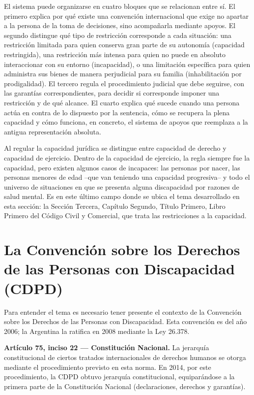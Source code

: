 \documentclass[12pt,oneside]{book}
\begin{document}
\begin{note}
El sistema puede organizarse en cuatro bloques que se relacionan entre sí. El primero explica por qué existe una convención internacional que exige no apartar a la persona de la toma de decisiones, sino acompañarla mediante apoyos. El segundo distingue qué tipo de restricción corresponde a cada situación: una restricción limitada para quien conserva gran parte de su autonomía (capacidad restringida), una restricción más intensa para quien no puede en absoluto interaccionar con su entorno (incapacidad), o una limitación específica para quien administra sus bienes de manera perjudicial para su familia (inhabilitación por prodigalidad). El tercero regula el procedimiento judicial que debe seguirse, con las garantías correspondientes, para decidir si corresponde imponer una restricción y de qué alcance. El cuarto explica qué sucede cuando una persona actúa en contra de lo dispuesto por la sentencia, cómo se recupera la plena capacidad y cómo funciona, en concreto, el sistema de apoyos que reemplaza a la antigua representación absoluta.
\end{note}

Al regular la capacidad jurídica se distingue entre capacidad de derecho y capacidad de ejercicio. Dentro de la capacidad de ejercicio, la regla siempre fue la capacidad, pero existen algunos casos de incapaces: las personas por nacer, las personas menores de edad --que van teniendo una capacidad progresiva-- y todo el universo de situaciones en que se presenta alguna discapacidad por razones de salud mental. Es en este último campo donde se ubica el tema desarrollado en esta sección: la Sección Tercera, Capítulo Segundo, Título Primero, Libro Primero del Código Civil y Comercial, que trata las restricciones a la capacidad.

\section{La Convención sobre los Derechos de las Personas con Discapacidad (CDPD)}

Para entender el tema es necesario tener presente el contexto de la Convención sobre los Derechos de las Personas con Discapacidad. Esta convención es del año 2006; la Argentina la ratifica en 2008 mediante la Ley 26.378.

\begin{important}
\textbf{Artículo 75, inciso 22 --- Constitución Nacional.} La jerarquía constitucional de ciertos tratados internacionales de derechos humanos se otorga mediante el procedimiento previsto en esta norma. En 2014, por este procedimiento, la CDPD obtuvo jerarquía constitucional, equiparándose a la primera parte de la Constitución Nacional (declaraciones, derechos y garantías).
\end{important}
\end{document}
